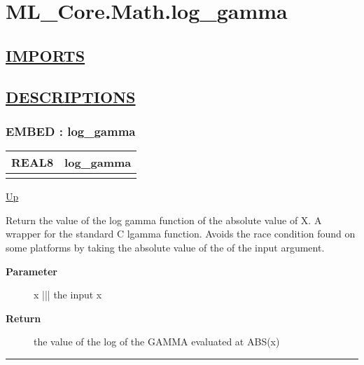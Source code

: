 \chapter*{ML\_Core.Math.log\_gamma}
\hypertarget{ecldoc:toc:ML_Core.Math.log_gamma}{}

\section*{\underline{IMPORTS}}

\section*{\underline{DESCRIPTIONS}}
\subsection*{EMBED : log\_gamma}
\hypertarget{ecldoc:ml_core.math.log_gamma}{}

{\renewcommand{\arraystretch}{1.5}
\begin{tabularx}{\textwidth}{|>{\raggedright\arraybackslash}l|X|}
\hline
\hspace{0pt}REAL8 & log\_gamma \\
\hline
\multicolumn{2}{|>{\raggedright\arraybackslash}X|}{\hspace{0pt}(REAL8 x)} \\
\hline
\end{tabularx}
}

\hyperlink{ecldoc:toc:ML_Core/Math}{Up}

\par
Return the value of the log gamma function of the absolute value of X. A wrapper for the standard C lgamma function. Avoids the race condition found on some platforms by taking the absolute value of the of the input argument.

\par
\begin{description}
\item [\textbf{Parameter}] x ||| the input x
\item [\textbf{Return}] the value of the log of the GAMMA evaluated at ABS(x)
\end{description}

\rule{\textwidth}{0.4pt}
